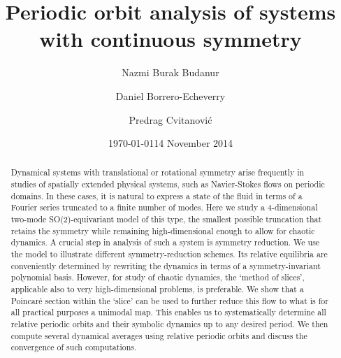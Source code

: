 \documentclass[aip,cha,
reprint,
secnumarabic,
nofootinbib, tightenlines,
nobibnotes, showkeys, showpacs,
groupedaddress,
]{revtex4-1}
\begin{document}
\title[Periodic orbit analysis of systems with continuous symmetry]
{Periodic orbit analysis of systems with continuous symmetry}

\author{Nazmi Burak Budanur}
\author{Daniel Borrero-Echeverry}
\author{Predrag Cvitanovi\'{c}}
    \ifdraft
\date{\today}
    \else
\date{14 November 2014}
   \fi

\begin{abstract}
Dynamical systems with translational or rotational symmetry arise
frequently in studies of spatially extended physical systems, such as
Navier-Stokes flows on periodic domains. In these cases, it is natural to
express a state of the fluid in terms of a Fourier series truncated to a
finite number of modes. Here we study a 4-dimensional two-mode
SO(2)-equivariant model of this type, the smallest possible truncation
that retains the symmetry while remaining high-dimensional enough to
allow for chaotic dynamics. A crucial step in analysis of such a system
is symmetry reduction. We use the model to illustrate different
symmetry-reduction schemes. Its relative equilibria are conveniently
determined by rewriting the dynamics in terms of a symmetry-invariant
polynomial basis. However, for study of chaotic dynamics, the `method of
slices', applicable also to very high-dimensional problems, is
preferable. We show that a Poincar\'e section within the `slice' can be
used to further reduce this flow to what is for all practical purposes a
unimodal map. This enables us to systematically determine all relative
periodic orbits and their symbolic dynamics up to any desired period. We
then compute several dynamical averages using relative periodic orbits
and discuss the convergence of such computations.
\end{abstract}

\maketitle
\end{document}
